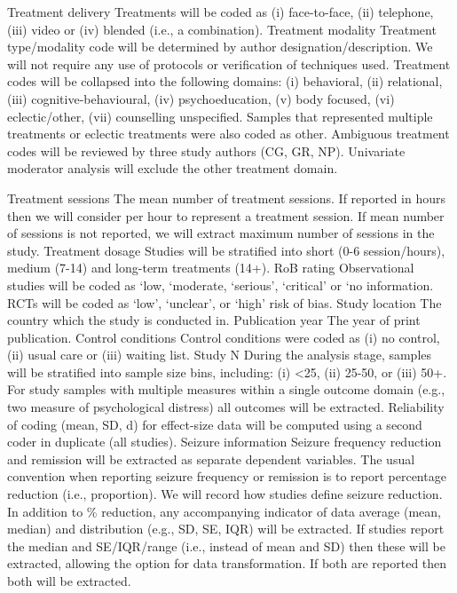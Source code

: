 \documentclass[
  12pt,
  openany]{book}
\begin{document}
Treatment delivery Treatments will be coded as (i) face-to-face, (ii) telephone, (iii) video or (iv) blended (i.e., a combination).
Treatment modality Treatment type/modality code will be determined by author designation/description. We will not require any use of protocols or verification of techniques used. Treatment codes will be collapsed into the following domains: (i) behavioral, (ii) relational, (iii) cognitive-behavioural, (iv) psychoeducation, (v) body focused, (vi) eclectic/other, (vii) counselling unspecified. Samples that represented multiple treatments or eclectic treatments were also coded as other. Ambiguous treatment codes will be reviewed by three study authors (CG, GR, NP). Univariate moderator analysis will exclude the other treatment domain.

Treatment sessions The mean number of treatment sessions. If reported in hours then we will consider per hour to represent a treatment session. If mean number of sessions is not reported, we will extract maximum number of sessions in the study.
Treatment dosage Studies will be stratified into short (0-6 session/hours), medium (7-14) and long-term treatments (14+).
RoB rating Observational studies will be coded as `low, `moderate, `serious', `critical' or `no information.
RCTs will be coded as `low', `unclear', or `high' risk of bias.
Study location The country which the study is conducted in.
Publication year The year of print publication.
Control conditions Control conditions were coded as (i) no control, (ii) usual care or (iii) waiting list.
Study N During the analysis stage, samples will be stratified into sample size bins, including: (i) \textless25, (ii) 25-50, or (iii) 50+.
For study samples with multiple measures within a single outcome domain (e.g., two measure of psychological distress) all outcomes will be extracted. Reliability of coding (mean, SD, d) for effect-size data will be computed using a second coder in duplicate (all studies).
Seizure information
Seizure frequency reduction and remission will be extracted as separate dependent variables. The usual convention when reporting seizure frequency or remission is to report percentage reduction (i.e., proportion). We will record how studies define seizure reduction. In addition to \% reduction, any accompanying indicator of data average (mean, median) and distribution (e.g., SD, SE, IQR) will be extracted. If studies report the median and SE/IQR/range (i.e., instead of mean and SD) then these will be extracted, allowing the option for data transformation. If both are reported then both will be extracted.
\end{document}
